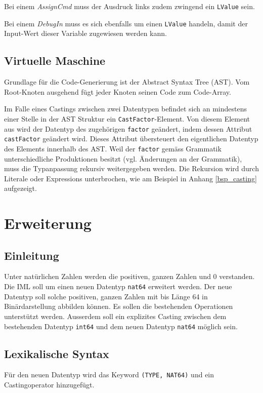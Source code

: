 \documentclass[10pt, a4paper, twocolumn]{article} %
\begin{document}
Bei einem \textit{AssignCmd} muss der Ausdruck links zudem zwingend ein \texttt{LValue} sein.

Bei einem \textit{DebugIn} muss es sich ebenfalls um einen \texttt{LValue} handeln, damit der Input-Wert dieser Variable zugewiesen werden kann.

\subsection{Virtuelle Maschine}
Grundlage für die Code-Generierung ist der Abstract Syntax Tree (AST).
Vom Root-Knoten ausgehend fügt jeder Knoten seinen Code zum Code-Array.

Im Falle eines Castings zwischen zwei Datentypen befindet sich an mindestens einer Stelle in der AST Struktur ein \texttt{CastFactor}-Element.
Von diesem Element aus wird der Datentyp des zugehörigen \texttt{factor} geändert, indem dessen Attribut \texttt{castFactor} geändert wird.
Dieses Attribut übersteuert den eigentlichen Datentyp des Elements innerhalb des AST.
Weil der \texttt{factor} gemäss Grammatik unterschiedliche Produktionen besitzt (vgl. Änderungen an der Grammatik), muss die Typanpassung rekursiv weitergegeben werden.
Die Rekursion wird durch Literale oder Expressions unterbrochen, wie am Beispiel in Anhang \ref{bsp_casting} aufgezeigt.

\section{Erweiterung}
\subsection{Einleitung}
Unter natürlichen Zahlen werden die positiven, ganzen Zahlen und 0 verstanden.
Die IML soll um einen neuen Datentyp \texttt{nat64} erweitert werden.
Der neue Datentyp soll solche positiven, ganzen Zahlen mit bis Länge 64 in Binärdarstellung abbilden können.
Es sollen die bestehenden Operationen unterstützt werden.
Ausserdem soll ein explizites Casting zwischen dem bestehenden Datentyp \texttt{int64} und dem neuen Datentyp \texttt{nat64} möglich sein.

\subsection{Lexikalische Syntax}
Für den neuen Datentyp wird das Keyword \texttt{(TYPE, NAT64)} und ein Castingoperator hinzugefügt.
\end{document}
